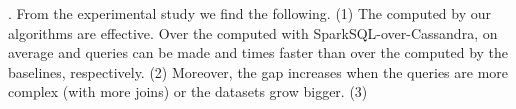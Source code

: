 . From the experimental study we find the following.
  (1)  The \bdss computed by our algorithms are effective.
  Over the computed  \bdss with SparkSQL-over-Cassandra,
  on average \tpch and \tpcds queries can be made  and 
 times faster than over the \bdss computed by the baselines,
 respectively.
 (2) Moreover, the gap increases when the queries are more
 complex (\ie with more joins) or the datasets grow bigger.
 (3) 


